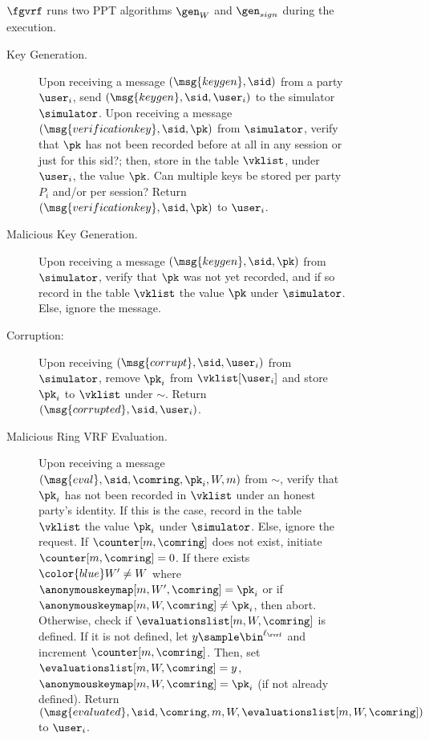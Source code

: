 \begin{figure}
	\begin{tcolorbox}
		{  $ \fgvrf $ runs two PPT algorithms $ \gen_W$ and $\gen_{sign} $ during the execution.
			
			 \begin{description}
				
				\item[Key Generation.] Upon receiving a message $(\msg{keygen}, \sid)$ from a party $\user_i$, send $(\msg{keygen}, \sid, \user_i)$ to the simulator $\simulator$.
				Upon receiving a message $(\msg{verificationkey}, \sid, \pk)$ from $\simulator$, verify that $\pk$ has not been recorded before {\color{blue} at all in any session or just for this sid?}; then, store in the table $\vklist$, under $\user_i$, the value $\pk$. {\color{blue} Can multiple keys be stored per party $P_i$ and/or per session?}
				Return $(\msg{verificationkey}, \sid, \pk)$ to $ \user_i$.
				
				\item[Malicious Key Generation.] Upon receiving a message $(\msg{keygen}, \sid, \pk)$ from $\simulator$, verify that $\pk$ was not yet recorded, and if so record in the table $\vklist$ the value $\pk$ under $\simulator$. Else, ignore the message.
				
				\item [Corruption:]  Upon receiving $ (\msg{corrupt}, \sid, \user_i) $ from $ \simulator $, remove $ \pk_i $ from $ \vklist[\user_i] $ and store $ \pk_i $ to $ \vklist $ under $ \sim $. Return $ (\msg{corrupted}, \sid,\user_i) $.
				\item[Malicious Ring VRF Evaluation.] Upon receiving a message $(\msg{eval}, \sid, \comring, \pk_i, W, m)$ from $\sim$, verify that $ \pk_i $ has not been recorded in $\vklist$ under an honest party's identity.
			    If this is the case, record in the table $\vklist$ the value $\pk_i$ under $\simulator$. Else, ignore the request.  If $ \counter[m,\comring] $ does not exist, initiate $ \counter[m,\comring] = 0 $. If there exists ${\color{blue} W' \neq W }$ where 
			    {\color{blue} $\anonymouskeymap[m,W',\comring] = \pk_i$ or if $\anonymouskeymap[m,W,\comring] \neq \pk_i$}, then abort. 
			    Otherwise, check if $ \evaluationslist[m,W,\comring] $ is defined. If it is not defined, let   $y \sample \bin^{\ell_\rvrf}$ and increment $ \counter[m,\comring] $. Then, set $ \evaluationslist[m, W, \comring] = y$, $ \anonymouskeymap[m,W,\comring] = \pk_i $ (if not already defined).
				Return $(\msg{evaluated}, \sid, \comring, m, W, \evaluationslist[m, W, \comring])$ to $ \user_i $.
				

\end{description}}
\end{tcolorbox}
\end{figure}
